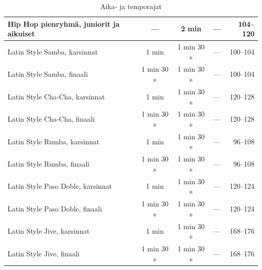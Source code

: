 \documentclass[12pt, a4paper, oneside]{article}
\begin{document}
\begin{table}[ht]
\begin{tabular}{@{\hspace{0.1cm}}lcccr@{\hspace{0.1cm}}}
        Hip Hop pienryhmä, juniorit ja aikuiset    & ---                 & 2 min                  & ---                    & 104--120       \\ \midrule
        Latin Style Samba, karsinnat               & 1 min               & 1 min 30 s             & ---                    & 100--104       \\
        Latin Style Samba, finaali                 & 1 min 30 s          & 1 min 30 s             & ---                    & 100--104       \\
        Latin Style Cha-Cha, karsinnat             & 1 min               & 1 min 30 s             & ---                    & 120--128       \\
        Latin Style Cha-Cha, finaali               & 1 min 30 s          & 1 min 30 s             & ---                    & 120--128       \\
        Latin Style Rumba, karsinnat               & 1 min               & 1 min 30 s             & ---                    &  96--108       \\
        Latin Style Rumba, finaali                 & 1 min 30 s          & 1 min 30 s             & ---                    &  96--108       \\
        Latin Style Paso Doble, karsinnat          & 1 min               & 1 min 30 s             & ---                    & 120--124       \\
        Latin Style Paso Doble, finaali            & 1 min 30 s          & 1 min 30 s             & ---                    & 120--124       \\
        Latin Style Jive, karsinnat                & 1 min               & 1 min 30 s             & ---                    & 168--176       \\
        Latin Style Jive, finaali                  & 1 min 30 s          & 1 min 30 s             & ---                    & 168--176       \\
        \bottomrule
    \end{tabular}
    \caption{Aika- ja temporajat}
    \label{tab:bpm-rajat}
\end{table}

\end{document}
